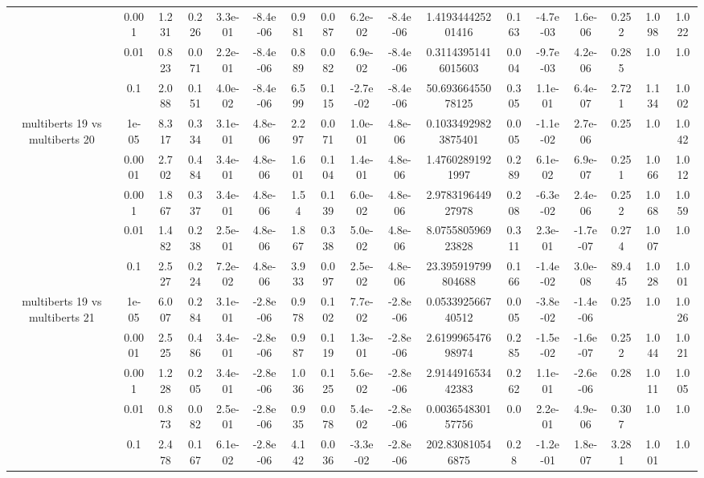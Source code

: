 \begin{tabular}{|c|c|c|c|c|c|c|c|c|c|c|c|c|c|c|c|c|}
 & 0.001 & 1.231 & 0.226 & 3.3e-01 & -8.4e-06 & 0.981 & 0.087 & 6.2e-02 & -8.4e-06 & 1.419344425201416 & 0.163 & -4.7e-03 & 1.6e-06 & 0.252 & 1.098 & 1.022 \\
 & 0.01 & 0.823 & 0.071 & 2.2e-01 & -8.4e-06 & 0.889 & 0.082 & 6.9e-02 & -8.4e-06 & 0.31143951416015603 & 0.004 & -9.7e-03 & 4.2e-06 & 0.285 & 1.0 & 1.0 \\
 & 0.1 & 2.088 & 0.151 & 4.0e-02 & -8.4e-06 & 6.599 & 0.115 & -2.7e-02 & -8.4e-06 & 50.69366455078125 & 0.305 & 1.1e-01 & 6.4e-07 & 2.721 & 1.134 & 1.002 \\
\hline
\multirow{5}{*}{multiberts 19 vs multiberts 20} & 1e-05 & 8.317 & 0.334 & 3.1e-01 & 4.8e-06 & 2.297 & 0.071 & 1.0e-01 & 4.8e-06 & 0.10334929823875401 & 0.005 & -1.1e-02 & 2.7e-06 & 0.25 & 1.0 & 1.042 \\
 & 0.0001 & 2.702 & 0.484 & 3.4e-01 & 4.8e-06 & 1.601 & 0.104 & 1.4e-01 & 4.8e-06 & 1.47602891921997 & 0.289 & 6.1e-02 & 6.9e-07 & 0.251 & 1.066 & 1.012 \\
 & 0.001 & 1.867 & 0.337 & 3.4e-01 & 4.8e-06 & 1.54 & 0.139 & 6.0e-02 & 4.8e-06 & 2.978319644927978 & 0.208 & -6.3e-02 & 2.4e-06 & 0.252 & 1.068 & 1.059 \\
 & 0.01 & 1.482 & 0.238 & 2.5e-01 & 4.8e-06 & 1.867 & 0.338 & 5.0e-02 & 4.8e-06 & 8.075580596923828 & 0.311 & 2.3e-01 & -1.7e-07 & 0.274 & 1.007 & 1.0 \\
 & 0.1 & 2.527 & 0.224 & 7.2e-02 & 4.8e-06 & 3.933 & 0.097 & 2.5e-02 & 4.8e-06 & 23.395919799804688 & 0.166 & -1.4e-02 & 3.0e-08 & 89.445 & 1.028 & 1.001 \\
\hline
\multirow{5}{*}{multiberts 19 vs multiberts 21} & 1e-05 & 6.007 & 0.284 & 3.1e-01 & -2.8e-06 & 0.978 & 0.102 & 7.7e-02 & -2.8e-06 & 0.053392566740512 & 0.005 & -3.8e-02 & -1.4e-06 & 0.25 & 1.0 & 1.026 \\
 & 0.0001 & 2.525 & 0.486 & 3.4e-01 & -2.8e-06 & 0.987 & 0.119 & 1.3e-01 & -2.8e-06 & 2.619996547698974 & 0.285 & -1.5e-02 & -1.6e-07 & 0.252 & 1.044 & 1.021 \\
 & 0.001 & 1.228 & 0.205 & 3.4e-01 & -2.8e-06 & 1.036 & 0.125 & 5.6e-02 & -2.8e-06 & 2.914491653442383 & 0.262 & 1.1e-01 & -2.6e-06 & 0.28 & 1.011 & 1.005 \\
 & 0.01 & 0.873 & 0.082 & 2.5e-01 & -2.8e-06 & 0.935 & 0.078 & 5.4e-02 & -2.8e-06 & 0.003654830157756 & 0.0 & 2.2e-01 & 4.9e-06 & 0.307 & 1.0 & 1.0 \\
 & 0.1 & 2.478 & 0.167 & 6.1e-02 & -2.8e-06 & 4.142 & 0.036 & -3.3e-02 & -2.8e-06 & 202.830810546875 & 0.28 & -1.2e-01 & 1.8e-07 & 3.281 & 1.001 & 1.0 \\

\end{tabular}
